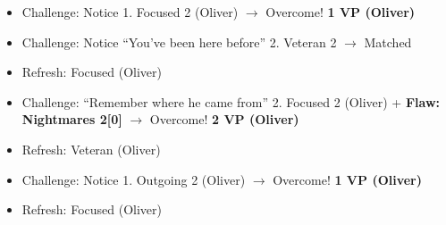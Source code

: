
{
\parskip=0pt
\begin{itemize}
\item Challenge: Notice 1.  Focused 2 (Oliver) $\rightarrow$ Overcome! \textbf{1 VP (Oliver)}
\item Challenge: Notice ``You've been here before'' 2.  Veteran 2 $\rightarrow$ Matched
\item Refresh: Focused (Oliver)
\item Challenge: ``Remember where he came from'' 2.  Focused 2 (Oliver) + \textbf{ {\color[RGB]{255,0,0}Flaw: Nightmares 2{[}0{]}} } $\rightarrow$ Overcome! \textbf{2 VP (Oliver)}
\end{itemize}

\begin{itemize}
\item Refresh: Veteran (Oliver)
\end{itemize}

\begin{itemize}
\item Challenge: Notice 1.  Outgoing 2 (Oliver) $\rightarrow$ Overcome! \textbf{1 VP (Oliver)}
\end{itemize}

\begin{itemize}
\item Refresh: Focused (Oliver)
\end{itemize}

}
